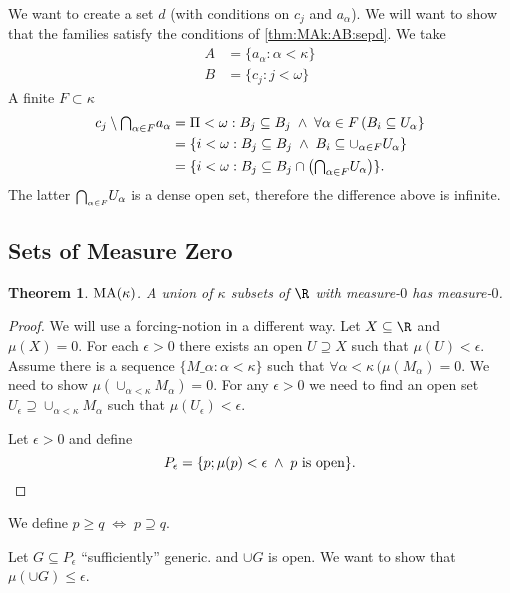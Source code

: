 \documentclass[11pt,pdftex,twoside,a4paper]{article}
\newcommand{\MA}{\ensuremath{\mathop{\rm MA}\nolimits}}
\newtheorem{thm}{Theorem}[section]
\theoremstyle{definition}
\begin{document}
We want to create a set $d$
(with conditions on \(c_j\) and \(a_\alpha\)).
We will want to show that the families satisfy 
the conditions of \ref{thm:MAk:AB:sepd}.
We take
\begin{align*}
A &= \{ a_\alpha: \alpha < \kappa\} \\
B &= \{c_j: j<\omega\}
\end{align*}
A finite \(F\subset  \kappa\)
\begin{align*}
c_j \setminus \mathsmaller{\bigcap_{\alpha\in F}} a_\alpha 
  &= \Pi<\omega: B_j \subseteq B_j\;\land\; 
    \forall \alpha\in F\,(B_i \subseteq U_\alpha\} \\
  &= \{i < \omega: B_j \subseteq B_j\;\land\;  
    B_i \subseteq \cup_{\alpha\in F} U_\alpha\} \\
  &= \{i < \omega: 
    B_j \subseteq B_j\cap
      \left(\mathsmaller{\bigcap_{\alpha\in F}} U_\alpha\right)\}.
\end{align*}
The latter \(\mathsmaller{\bigcap_{\alpha\in F}} U_\alpha\) is a dense open set,
therefore the difference above is infinite.

\subsection{Sets of Measure Zero}

\begin{thm}
\(\MA(\kappa)\).
A union of \(\kappa\) subsets of \(\R\) with measure-$0$
has measure-$0$.
\end{thm}
\begin{proof}
We will use a forcing-notion in a different way.
Let \(X\subseteq\R\) and \(\mu(X)=0\).
For each \(\epsilon>0\) there exists an open \(U\supseteq X\)
such that \(\mu(U)<\epsilon\).
Assume there is a sequence \(\{M\_\alpha: \alpha<\kappa\}\)
such that \(\forall \alpha<\kappa\,(\mu(M_\alpha)=0\).
We need to show \(\mu(\cup_{\alpha<\kappa}M_\alpha) = 0\).
For any \(\epsilon > 0\) we need to find an open set 
\(U_\epsilon \supseteq \cup_{\alpha<\kappa}M_\alpha\)
such that \(\mu(U_\epsilon)<\epsilon\).

Let \(\epsilon>0\) and define
\begin{equation*}
P_\epsilon = \{p; \mu(p)<\epsilon\;\land\;p\textnormal{ is open}\}.
\end{equation*}
\end{proof}
We define \(p \geq q \; \iff \; p \supseteq q\).

Let \(G \subseteq P_\epsilon\) ``sufficiently'' generic.
and \(\cup G\) is open.
We want to show that \(\mu(\cup G) \leq \epsilon\).
\end{document}
